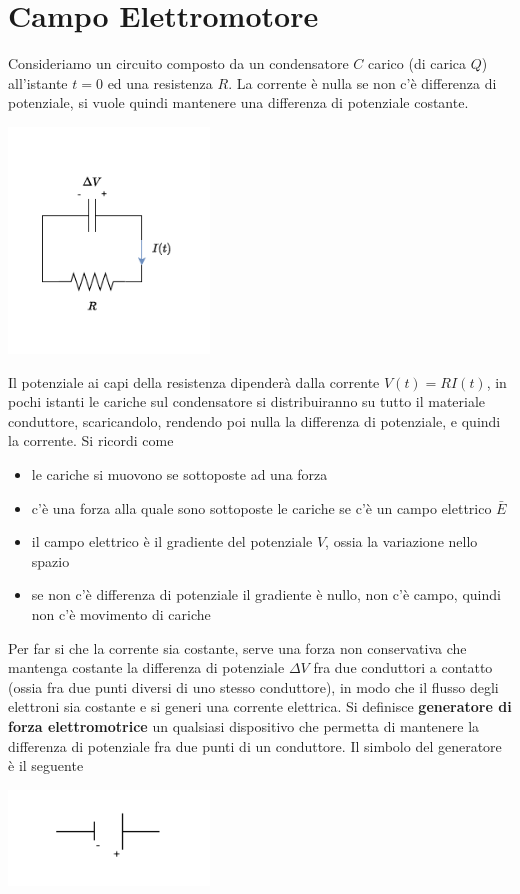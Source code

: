 \documentclass[10pt, letterpaper]{report}
\begin{document}
\section{Campo Elettromotore}
Consideriamo un circuito composto da un condensatore $C$ carico (di carica $Q$) all'istante $t=0$ ed una resistenza $R$.
La corrente è nulla se non c'è differenza di potenziale, si vuole quindi mantenere una differenza di potenziale costante.
\begin{center}
    \includegraphics[width=0.4\textwidth]{images/circuit.pdf}
\end{center}
Il potenziale ai capi della resistenza dipenderà dalla corrente $V(t)=RI(t)$, in pochi istanti le cariche sul condensatore si distribuiranno su tutto il materiale conduttore, scaricandolo, rendendo poi nulla la differenza di potenziale, e quindi la corrente. Si ricordi come \begin{itemize}
    \item le cariche si muovono se sottoposte ad una forza 
    \item c'è una forza alla quale sono sottoposte le cariche se c'è un campo elettrico $\bar E$
    \item il campo elettrico è il gradiente del potenziale $V$, ossia la variazione nello spazio 
    \item se non c'è differenza di potenziale il gradiente è nullo, non c'è campo, quindi non c'è movimento di cariche
\end{itemize}
Per far si che la corrente sia costante, serve una forza non conservativa che mantenga costante la differenza di potenziale $\Delta V$ fra due conduttori a contatto (ossia fra due punti diversi di uno stesso conduttore), in modo che il flusso degli elettroni sia costante e si generi una corrente elettrica.\acc 
Si definisce \textbf{generatore di forza elettromotrice} un qualsiasi dispositivo che permetta di mantenere la differenza di potenziale fra due punti di un conduttore. Il simbolo del generatore è il seguente\begin{center}
    \includegraphics[width=0.4\textwidth]{images/tensione.pdf}
\end{center}
\end{document}
